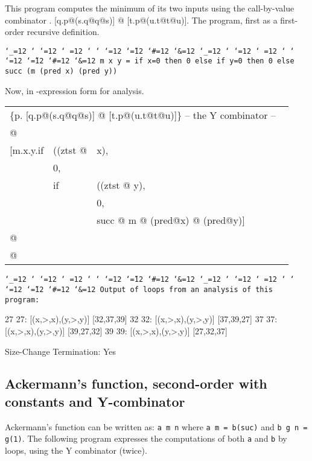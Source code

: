 \documentclass{LMCS}
\makeatletter
\newcommand{\hair}{\hspace{2mm}}
\newcommand{\vair}{\relax}
\newcommand{\bt}{\begin{tabular}}
\newcommand{\et}{\end{tabular}}
\newcommand{\bp}{\begin{program}\small}
\newcommand{\ep}{\end{program}}
\newcommand{\programenvironment}{\programmode \def\par{\leavevmode\endgraf}\obeylines\nobreak \programmode}
\newcommand{\programmode}{\tt \catcode`\_=12 \catcode`\?=12 \catcode`\.=12 \catcode`\,=12
	\catcode`\;=12 \catcode`\:=12 \catcode`\@=12 \catcode`\~=12
        \catcode`\#=12 \catcode`\&=12      \obeyspaces\frenchspacing}
\newenvironment{programintext}{\programenvironment}{}
\newenvironment{program}{\setlength{\partopsep}{0mm}\setlength{\topsep}{0mm}
	\begin{trivlist}\item[]
\hspace*{5mm}\begin{minipage}{1.0\textwidth}
\vspace{1mm}
	\begin{programintext}
	}{\end{programintext}
	\vspace{1mm}
	\end{minipage}
	\end{trivlist}
	\noindent}
\theoremstyle{definition}\newtheorem{env}[thm]{Environment}
\makeatother
\begin{document}
This program computes the minimum of its two inputs using the call-by-value 
combinator 
 {\ttp. [q.p@(s.q@q@s)] @
                     [t.p@(u.t@t@u)]}.
The program, first as a first-order recursive definition.

\bp
  m x y = if x=0 then 0 else if y=0 then 0 else succ (m (pred x) (pred y))

\ep
Now,  in -expression form for analysis.\medskip


{\tt\bt{lllllll}
\multicolumn{7}{l}{
\{p. [q.p@(s.q@q@s)] @
                     [t.p@(u.t@t@u)]\} \hair -- the Y combinator --}\\

@\\

[m.x.y.\fbox{27:}if&((ztst @ &x),\\

&0,\\

&\fbox{32:}\hair\hair if&((ztst @ y),\\

&&0,\\

&&\fbox{37:}succ @ \fbox{39:} m @ (pred@x) @ (pred@y)] \\

@ \\

@ 
\et}



\bp
Output of loops from an analysis of this program:

27  27: [(x,>,x),(y,>,y)]    [32,37,39]
32  32: [(x,>,x),(y,>,y)]    [37,39,27]
37  37: [(x,>,x),(y,>,y)]    [39,27,32]
39  39: [(x,>,x),(y,>,y)]    [27,32,37]

Size-Change Termination: Yes
\ep
\vair
\subsection{Ackermann's function, second-order with constants and Y-combinator}

Ackermann's function can be written as:
{\tt a m n} where {\tt a m = b(suc)} and
{\tt b g n = g(1)}. The following program 
expresses the computations of both {\tt a} and {\tt b} by loops,
using the Y 
combinator (twice). 
\vair
\end{document}

